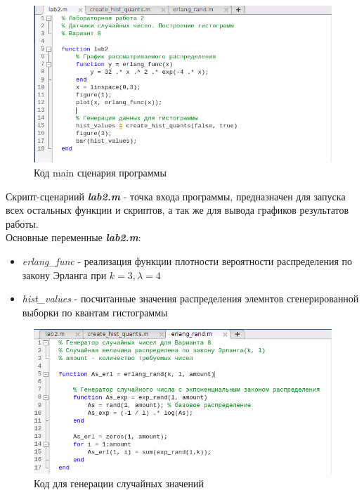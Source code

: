 \documentclass[12pt]{article}
\begin{document}
 \begin{figure}[!h]
	\centering
	\includegraphics[width=\linewidth]{lab2_code.png}
	\caption{Код main сценария программы}
\end{figure}

Скрипт-сценариий \textbf{\textit{lab2.m}} - точка входа программы, предназначен для запуска всех остальных функции и скриптов, а так же для вывода графиков результатов работы.\\

Основные переменные \textbf{\textit{lab2.m}}:
\begin{itemize}
	\item {\textit{erlang\_func}} - реализация функции плотности вероятности распределения по закону Эрланга при $k = 3, \lambda = 4$
	\item \textit{hist\_values} - посчитанные значения распределения элемнтов сгенерированной выборки по квантам гистограммы
\end{itemize}

\newpage
 
 
\begin{figure}[!h]
	\centering
	\includegraphics[width=\linewidth]{erlang_rand_code.png}
	\caption{Код для генерации случайных значений}
\end{figure}
\end{document}
